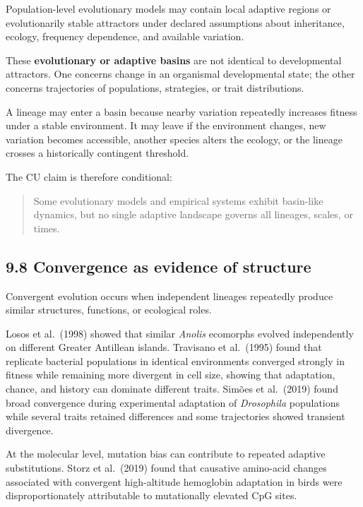 \documentclass[
  11pt,
]{article}
\begin{document}
Population-level evolutionary models may contain local adaptive regions
or evolutionarily stable attractors under declared assumptions about
inheritance, ecology, frequency dependence, and available variation.

These \textbf{evolutionary or adaptive basins} are not identical to
developmental attractors. One concerns change in an organismal
developmental state; the other concerns trajectories of populations,
strategies, or trait distributions.

A lineage may enter a basin because nearby variation repeatedly
increases fitness under a stable environment. It may leave if the
environment changes, new variation becomes accessible, another species
alters the ecology, or the lineage crosses a historically contingent
threshold.

The CU claim is therefore conditional:

\begin{quote}
Some evolutionary models and empirical systems exhibit basin-like
dynamics, but no single adaptive landscape governs all lineages, scales,
or times.
\end{quote}

\subsection{9.8 Convergence as evidence of
structure}\label{convergence-as-evidence-of-structure}

Convergent evolution occurs when independent lineages repeatedly produce
similar structures, functions, or ecological roles.

Losos et al.~(1998) showed that similar \emph{Anolis} ecomorphs evolved
independently on different Greater Antillean islands. Travisano et
al.~(1995) found that replicate bacterial populations in identical
environments converged strongly in fitness while remaining more
divergent in cell size, showing that adaptation, chance, and history can
dominate different traits. Simões et al.~(2019) found broad convergence
during experimental adaptation of \emph{Drosophila} populations while
several traits retained differences and some trajectories showed
transient divergence.

At the molecular level, mutation bias can contribute to repeated
adaptive substitutions. Storz et al.~(2019) found that causative
amino-acid changes associated with convergent high-altitude hemoglobin
adaptation in birds were disproportionately attributable to mutationally
elevated CpG sites.
\end{document}
